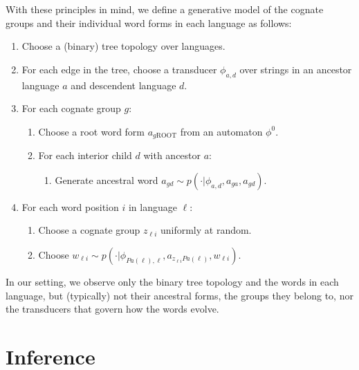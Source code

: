 \documentclass[11pt,a4paper]{article}
\begin{document}
With these principles in mind, we define a generative model of the
cognate groups and their individual word forms in each language as
follows:
\begin{enumerate}
  \item Choose a (binary) tree topology over languages.
  \item For each edge in the tree, choose a transducer $\phi_{a,d}$ over strings in an ancestor language $a$ and descendent language $d$.
  \item For each cognate group $g$:
    \begin{enumerate}
      \item Choose a root word form $a_{g\mathrm{ROOT}}$ from an automaton $\phi^0$.
      \item For each interior child $d$ with ancestor $a$:
        \begin{enumerate}
          \item Generate ancestral word $a_{gd} \sim p(\cdot|\phi_{a,d},a_{ga},a_{gd})$.
        \end{enumerate}
    \end{enumerate}
  \item For each word position $i$ in language $\ell$:
    \begin{enumerate}
      \item Choose a cognate group $z_{\ell i}$ uniformly at random. 
      \item Choose $w_{\ell i} \sim p(\cdot|\phi_{Pa(\ell),\ell},a_{z_{\ell i}Pa(\ell)},w_{\ell i})$.
    \end{enumerate}
\end{enumerate}

In our setting, we observe only the binary tree topology and the
words in each language, but (typically) not their ancestral forms,
the groups they belong to, nor the transducers that govern how the
words evolve. 

\section{Inference}
\end{document}
